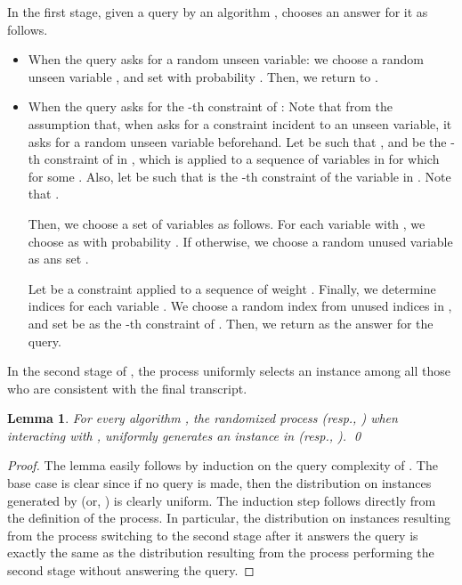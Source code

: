 \documentclass[letterpaper, 11pt]{article}
\newtheorem{lemma}[theorem]{Lemma}
\begin{document}
In the first stage,
given a query by an algorithm , 
 chooses an answer for it as follows.
\begin{itemize}
\setlength{\itemsep}{0pt}
\item When the query asks for a random unseen variable: 
  we choose a random unseen variable , 
  and set  with probability .
  Then, we return  to .
\item When the query asks for the -th constraint of :
  Note that  from the assumption that, when  asks for a constraint incident to an unseen variable, it asks for a random unseen variable beforehand.
  Let  be such that , and  be the -th constraint of  in ,
  which is applied to a sequence of variables  in  for which  for some .
  Also, let  be such that  is the -th constraint of the variable  in .
  Note that .
  
  Then, we choose a set of variables  as follows.
  For each variable  with ,
  we choose  as  with probability .
  If otherwise, we choose a random unused variable  as  ans set .

  Let  be a constraint applied to a sequence  of weight .
  Finally, we determine indices for each variable .
  We choose a random index  from unused indices in ,
  and set  be as the -th constraint of .
  Then, we return  as the answer for the query.
\end{itemize}
In the second stage of , 
the process uniformly selects an instance  among all those who are consistent with the final transcript.

\begin{lemma}\label{lmm:equivalent}
  For every algorithm , 
  the randomized process  (resp., ) when interacting with , 
  uniformly generates an instance  in  (resp., ).
  \qed
\end{lemma}
\begin{proof}
  The lemma easily follows by induction on the query complexity of .
  The base case is clear since if no query is made, 
  then the distribution on instances generated by  (or, ) is clearly uniform.
  The induction step follows directly from the definition of the process.
  In particular, 
  the distribution on instances resulting from the process switching to the second stage after it answers the query is exactly the same as the distribution resulting from the process performing the second stage without answering the query.
\end{proof}
\end{document}
